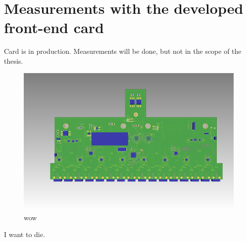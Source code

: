 \section{Measurements with the developed front-end card}
Card is in production. Measurements will be done, but not in the scope of the thesis.
\begin{figure}[H]
	\centering
	\includegraphics[width = \textwidth]{chap/05-conclusion/img/board_ugly}
	\caption{wow}
	\label{fig:board}
\end{figure}






I want to die.